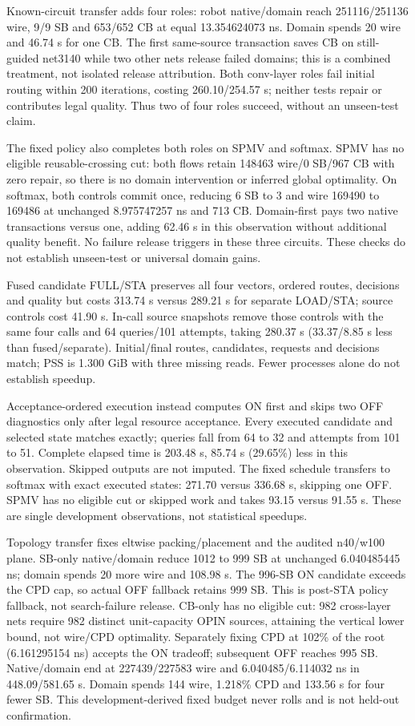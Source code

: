 \documentclass[conference,10pt]{IEEEtran}
\begin{document}
Known-circuit transfer adds four roles: robot native/domain reach 251116/251136 wire, 9/9 SB and 653/652 CB at equal 13.354624073 ns. Domain spends 20 wire and 46.74 s for one CB. The first same-source transaction saves CB on still-guided net3140 while two other nets release failed domains; this is a combined treatment, not isolated release attribution. Both conv-layer roles fail initial routing within 200 iterations, costing 260.10/254.57 s; neither tests repair or contributes legal quality. Thus two of four roles succeed, without an unseen-test claim.

The fixed policy also completes both roles on SPMV and softmax. SPMV has no eligible reusable-crossing cut: both flows retain 148463 wire/0 SB/967 CB with zero repair, so there is no domain intervention or inferred global optimality. On softmax, both controls commit once, reducing 6 SB to 3 and wire 169490 to 169486 at unchanged 8.975747257 ns and 713 CB. Domain-first pays two native transactions versus one, adding 62.46 s in this observation without additional quality benefit. No failure release triggers in these three circuits. These checks do not establish unseen-test or universal domain gains.

Fused candidate FULL/STA preserves all four vectors, ordered routes, decisions and quality but costs 313.74 s versus 289.21 s for separate LOAD/STA; source controls cost 41.90 s. In-call source snapshots remove those controls with the same four calls and 64 queries/101 attempts, taking 280.37 s (33.37/8.85 s less than fused/separate). Initial/final routes, candidates, requests and decisions match; PSS is 1.300 GiB with three missing reads. Fewer processes alone do not establish speedup.

Acceptance-ordered execution instead computes ON first and skips two OFF diagnostics only after legal resource acceptance. Every executed candidate and selected state matches exactly; queries fall from 64 to 32 and attempts from 101 to 51. Complete elapsed time is 203.48 s, 85.74 s (29.65\%) less in this observation. Skipped outputs are not imputed. The fixed schedule transfers to softmax with exact executed states: 271.70 versus 336.68 s, skipping one OFF. SPMV has no eligible cut or skipped work and takes 93.15 versus 91.55 s. These are single development observations, not statistical speedups.

Topology transfer fixes eltwise packing/placement and the audited n40/w100 plane. SB-only native/domain reduce 1012 to 999 SB at unchanged 6.040485445 ns; domain spends 20 more wire and 108.98 s. The 996-SB ON candidate exceeds the CPD cap, so actual OFF fallback retains 999 SB. This is post-STA policy fallback, not search-failure release. CB-only has no eligible cut: 982 cross-layer nets require 982 distinct unit-capacity OPIN sources, attaining the vertical lower bound, not wire/CPD optimality. Separately fixing CPD at 102\% of the root (6.161295154 ns) accepts the ON tradeoff; subsequent OFF reaches 995 SB. Native/domain end at 227439/227583 wire and 6.040485/6.114032 ns in 448.09/581.65 s. Domain spends 144 wire, 1.218\% CPD and 133.56 s for four fewer SB. This development-derived fixed budget never rolls and is not held-out confirmation.
\end{document}
